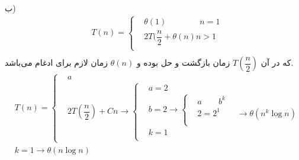\documentclass[10pt,a4paper]{article}
\begin{document}
ب)\\
\begin{align*}
&T(n)=\begin{cases}
&\theta (1) \qquad\qquad n=1\\
&2T(\dfrac{n}{2}+\theta (n) n>1\\
\end{cases}\\
\end{align*}
که در آن $T(\dfrac{n}{2})$ زمان بازگشت و حل بوده و $\theta (n)$ زمان لازم برای ادغام می‌باشد.\\
\begin{align*}
&T(n)=\begin{cases}
&a \\
&2T(\dfrac{n}{2}) + Cn \to \begin{cases}
&a = 2\\
&b = 2 \to \begin{cases}
&a \qquad b^k\\
&2 = 2^1 \qquad \to \theta (n^k \log n)\\
\end{cases} \\
&k = 1 \\
\end{cases}
\end{cases}\\
&k=1\to \theta (n\log n)\\
\end{align*}
\end{document}

